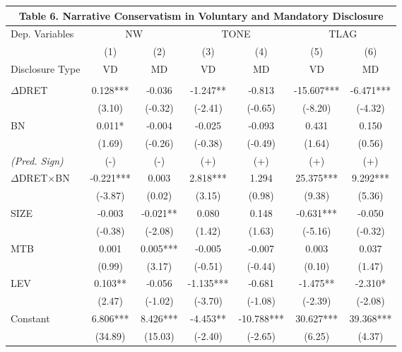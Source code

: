 \begin{table}[H] \label{T6}
  \begin{center}
  	\begin{tabular}{lcccccc}
  		\multicolumn{7}{c}{\textbf{Table 6. Narrative Conservatism in Voluntary and Mandatory Disclosure}} \\
  		\midrule
  		\midrule
  		Dep. Variables & \multicolumn{2}{c}{NW} & \multicolumn{2}{c}{TONE} & \multicolumn{2}{c}{TLAG} \\
  		\cmidrule{2-7}
  		& (1) & (2) & (3) & (4) & (5) & (6) \\
  		Disclosure Type & VD & MD & VD & MD & VD & MD \\
  		\midrule
  		&   &  &   &   &   & \\
  		$\Delta$DRET & 0.128*** & -0.036 & -1.247** & -0.813 & -15.607*** & -6.471*** \\
  		& (3.10) & (-0.32) & (-2.41) & (-0.65) & (-8.20) & (-4.32) \\
  		BN & 0.011* & -0.004 & -0.025 & -0.093 & 0.431 & 0.150 \\
  		& (1.69) & (-0.26) & (-0.38) & (-0.49) & (1.64) & (0.56) \\
  		\rowcolor[rgb]{ .933,  .925,  .882} \textit{(Pred. Sign)} & (-) & (-) & (+) & (+) & (+) & (+) \\
  		\rowcolor[rgb]{ .933,  .925,  .882} $\Delta$DRET$\times$BN & -0.221*** & 0.003 & 2.818*** & 1.294 & 25.375*** & 9.292*** \\
  		\rowcolor[rgb]{ .933,  .925,  .882}   & (-3.87) & (0.02) & (3.15) & (0.98) & (9.38) & (5.36) \\
  		SIZE & -0.003 & -0.021** & 0.080 & 0.148 & -0.631*** & -0.050 \\
  		& (-0.38) & (-2.08) & (1.42) & (1.63) & (-5.16) & (-0.32) \\
  		MTB & 0.001 & 0.005*** & -0.005 & -0.007 & 0.003 & 0.037 \\
  		& (0.99) & (3.17) & (-0.51) & (-0.44) & (0.10) & (1.47) \\
  		LEV & 0.103** & -0.056 & -1.135*** & -0.681 & -1.475** & -2.310* \\
  		& (2.47) & (-1.02) & (-3.70) & (-1.08) & (-2.39) & (-2.08) \\
  		Constant & 6.806*** & 8.426*** & -4.453** & -10.788*** & 30.627*** & 39.368*** \\
  		& (34.89) & (15.03) & (-2.40) & (-2.65) & (6.25) & (4.37) \\

\end{tabular}
\end{center}
\end{table}
